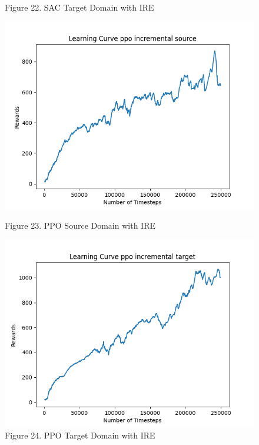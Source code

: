 \documentclass[12pt]{article}
\begin{document}
\begin{figure}[H]
\begin{minipage}{0.45\textwidth}
        \caption{Figure 22. SAC Target Domain with IRE}
        \label{fig:sac_target_ire}
    \end{minipage}
    \vfill
    \begin{minipage}{0.45\textwidth}
        \centering
        \includegraphics[width=\textwidth]{../images/Learning_Curve_PPO_Incremental_Source.png}
        \caption{Figure 23. PPO Source Domain with IRE}
        \label{fig:ppo_source_ire}
    \end{minipage}
    \hfill
    \begin{minipage}{0.45\textwidth}
        \centering
        \includegraphics[width=\textwidth]{../images/Learning_Curve_PPO_Incremental_Target.png}
        \caption{Figure 24. PPO Target Domain with IRE}
        \label{fig:ppo_target_ire}
    \end{minipage}
\end{figure}
\end{document}
